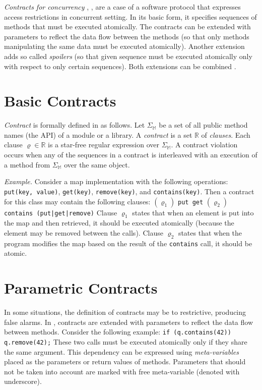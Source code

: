 \emph{Contracts for concurrency} \cite{FITPUB10817},
\cite{DBLP:journals/corr/SousaDFL15}, are a case of a software protocol that
expresses access restrictions in concurrent setting. In its basic form, it
specifies sequences of methods that must be executed atomically. The contracts
can be extended with parameters to reflect the data flow between the methods (so
that only methods manipulating the same data must be executed atomically).
Another extension adds so called \emph{spoilers} (so that given sequence must be
executed atomically only with respect to only certain sequences). Both
extensions can be combined \cite{FITPUB11510}.


\section{Basic Contracts}

\emph{Contract} is formally defined in \cite{FITPUB10817} as follows. Let
$\Sigma_\mathbb{M}$ be a set of all public method names (the API) of a module or
a library. A \emph{contract} is a set $\mathbb{R}$ of \emph{clauses}. Each
clause $\varrho \in \mathbb{R}$ is a star-free regular expression over
$\Sigma_\mathbb{M}$. A contract violation occurs when any of the sequences in a
contract is interleaved with an execution of a method from $\Sigma_\mathbb{M}$
over the same object.

\emph{Example.} Consider a map implementation with the following operations:
\texttt{put(key, value)}, \texttt{get(key)}, \texttt{remove(key)}, and
\texttt{contains(key)}. Then a contract for this class may contain the following
clauses:  \newline
    $(\varrho_1)$ \texttt{put get} \newline
    $(\varrho_2)$ \texttt{contains (put|get|remove)} \newline
Clause $\varrho_1$ states that when an element is put into the map and then
retrieved, it should be executed atomically (because the element may be removed
between the calls). Clause $\varrho_2$ states that when the program modifies the
map based on the result of the \texttt{contains} call, it should be atomic.



\section{Parametric Contracts}

In some situations, the definition of contracts may be to restrictive, producing
false alarms. In \cite{FITPUB11510}, contracts are extended with parameters to
reflect the data flow between methods. Consider the following example:
\newline
\texttt{if (q.contains(42)) q.remove(42);} \newline
These two calls must be executed atomically only if they share the same
argument. This dependency can be expressed using \emph{meta-variables} placed as
the parameters or return values of methods. Parameters that should not be taken
into account are marked with free meta-variable (denoted with underscore).

